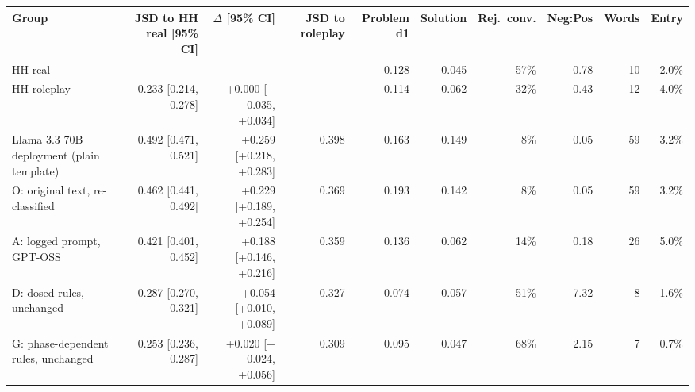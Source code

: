 \begin{tabular}{lrrrrrrrrr}
\toprule
Group & JSD to HH real [95\% CI] & $\Delta$ [95\% CI] & JSD to roleplay & Problem d1 & Solution & Rej.\ conv. & Neg:Pos & Words & Entry \\
\midrule
HH real &  &  &  & 0.128 & 0.045 & 57\% & 0.78 & 10 & 2.0\% \\
HH roleplay & 0.233 [0.214, 0.278] & +0.000 [$-$0.035, +0.034] &  & 0.114 & 0.062 & 32\% & 0.43 & 12 & 4.0\% \\
\midrule
Llama 3.3 70B deployment (plain template) & 0.492 [0.471, 0.521] & +0.259 [+0.218, +0.283] & 0.398 & 0.163 & 0.149 & 8\% & 0.05 & 59 & 3.2\% \\
\midrule
O: original text, re-classified & 0.462 [0.441, 0.492] & +0.229 [+0.189, +0.254] & 0.369 & 0.193 & 0.142 & 8\% & 0.05 & 59 & 3.2\% \\
A: logged prompt, GPT-OSS & 0.421 [0.401, 0.452] & +0.188 [+0.146, +0.216] & 0.359 & 0.136 & 0.062 & 14\% & 0.18 & 26 & 5.0\% \\
D: dosed rules, unchanged & 0.287 [0.270, 0.321] & +0.054 [+0.010, +0.089] & 0.327 & 0.074 & 0.057 & 51\% & 7.32 & 8 & 1.6\% \\
G: phase-dependent rules, unchanged & 0.253 [0.236, 0.287] & +0.020 [$-$0.024, +0.056] & 0.309 & 0.095 & 0.047 & 68\% & 2.15 & 7 & 0.7\% \\
\bottomrule
\end{tabular}
